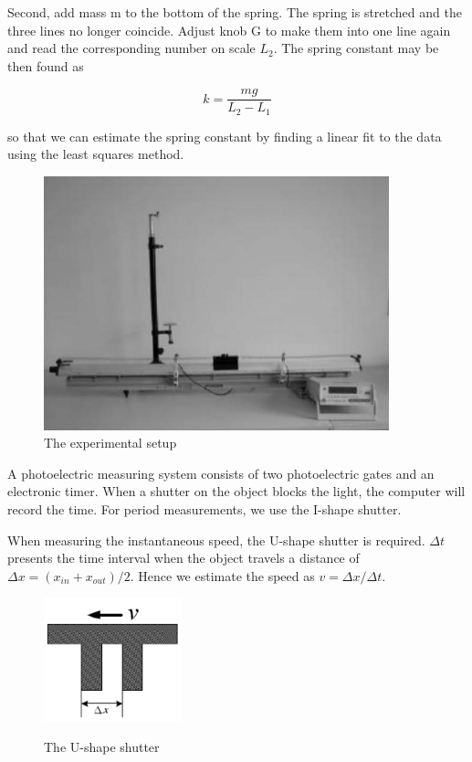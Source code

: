 Second, add mass m to the bottom of the spring. The spring is stretched and the
three lines no longer coincide. Adjust knob G to make them into one line again
and read the corresponding number on scale $L_2$. The spring constant may be
then found as 

\begin{equation}
k=\frac{mg}{L_2-L_1}
\end{equation}

so that we can estimate the spring constant by finding a linear fit to the data
using the least squares method.

\begin{figure}[h]
\centering
\label{airtrack}
\includegraphics[width=10cm]{fig/eair}
\caption{The experimental setup}
\end{figure}

A photoelectric measuring system consists of two photoelectric gates and an
electronic timer. When a shutter on the object blocks the light, the computer
will record the time. For period measurements, we use the I-shape shutter. 

When measuring the instantaneous speed, the U-shape shutter is required. $\Delta t$
presents the time interval when the object travels a distance of $\Delta
x=(x_{in}+x_{out})/2$. Hence we estimate the speed as $v=\Delta x/\Delta t$. 

\begin{figure}[H]
\centering
\includegraphics[width=4cm]{fig/eushape}
\label{ushape}
\caption{The U-shape shutter}
\end{figure}
